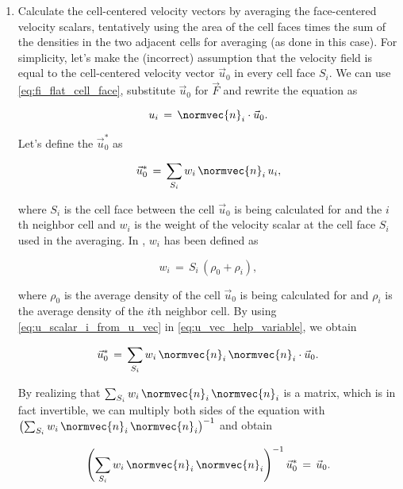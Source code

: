 \begin{enumerate}
    \item Calculate the cell-centered velocity vectors by averaging the face-centered velocity scalars, tentatively using the area of the cell faces times the sum of the densities in the two adjacent cells for averaging (as done in this case). For simplicity, let's make the (incorrect) assumption that the velocity field is equal to the cell-centered velocity vector $\vec{u}_0$ in every cell face $S_i$. We can use \eqref{eq:fi_flat_cell_face}, substitute $\vec{u}_0$ for $\vec{F}$ and rewrite the equation as
    
    \begin{equation} \label{eq:u_scalar_i_from_u_vec}
    u_i \,=\, \normvec{n}_i\cdot\vec{u}_0.
    \end{equation}
    
    Let's define the  $\vec{u}_0^*$ as
    
    \begin{equation} \label{eq:u_vec_help_variable}
    \vec{u}_0^* \,=\, \sum_{S_i}w_i\,\normvec{n}_i\,u_i,
    \end{equation}
    
    where $S_i$ is the cell face between the cell $\vec{u}_0$ is being calculated for and the $i$th neighbor cell and $w_i$ is the weight of the velocity scalar at the cell face $S_i$ used in the averaging. In \thisprojectwork, $w_i$ has been defined as
    
    \begin{equation}
    w_i \,=\, S_i\,(\rho_0 + \rho_i),
    \end{equation}
    
    where $\rho_0$ is the average density of the cell $\vec{u}_0$ is being calculated for and $\rho_i$ is the average density of the $i$th neighbor cell. By using \eqref{eq:u_scalar_i_from_u_vec} in \eqref{eq:u_vec_help_variable}, we obtain
    
    \begin{equation}
    \vec{u}_0^* \,=\, \sum_{S_i}w_i\,\normvec{n}_i\,\normvec{n}_i\cdot\vec{u}_0.
    \end{equation}
    
    By realizing that $\sum_{S_i}w_i\,\normvec{n}_i\,\normvec{n}_i$ is a matrix, which is in fact invertible, we can multiply both sides of the equation with $\left(\sum_{S_i}w_i\,\normvec{n}_i\,\normvec{n}_i\right)^{-1}$ and obtain
    
    \begin{equation}
    \left(\sum_{S_i}w_i\,\normvec{n}_i\,\normvec{n}_i\right)^{-1}\vec{u}_0^* \,=\, \vec{u}_0.
    \end{equation}
    

\end{enumerate}
